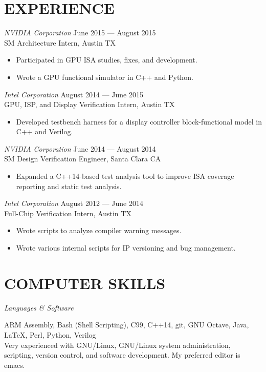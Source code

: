 \documentclass[margin]{res}
\begin{document}
\begin{resume}
  \section{EXPERIENCE}
  {\sl NVIDIA Corporation}
  \hfill June 2015 --- August 2015 \\
  SM Architecture Intern, Austin TX
  \vspace{0.25em}
  \begin{itemize}
  \item Participated in GPU ISA studies, fixes, and development.
  \item Wrote a GPU functional simulator in C++ and Python.
  \end{itemize}
  {\sl Intel Corporation}
  \hfill August 2014 --- June 2015 \\
  GPU, ISP, and Display Verification Intern, Austin TX
  \vspace{0.25em}
  \begin{itemize}
  \item Developed testbench harness for a display controller
    block-functional model in C++ and Verilog.
  \end{itemize}
  {\sl NVIDIA Corporation}
  \hfill June 2014 --- August 2014 \\
  SM Design Verification Engineer, Santa Clara CA
  \vspace{0.25em}
  \begin{itemize}
  \item Expanded a C++14-based test analysis tool to improve ISA
    coverage reporting and static test analysis.
  \end{itemize}
  {\sl Intel Corporation}
  \hfill August 2012 --- June 2014 \\
  Full-Chip Verification Intern, Austin TX
  \vspace{0.25em}
  \begin{itemize}
  \item Wrote scripts to analyze compiler warning messages.
  \item Wrote various internal scripts for IP versioning and bug
    management.
  \end{itemize}

  \section{COMPUTER SKILLS}
  {\sl Languages \& Software} \\
  \vspace{-1.0em}
  \begin{adjustwidth}{1.5em}{0pt}
    ARM Assembly, Bash (Shell Scripting), C99, C++14, git, GNU Octave,
    Java, \LaTeX, Perl, Python, Verilog
    \vspace{0.5em} \\
    Very experienced with GNU/Linux, GNU/Linux system administration,
    scripting, version control, and software development. My preferred
    editor is emacs.
  \end{adjustwidth}


\end{resume}
\end{document}
